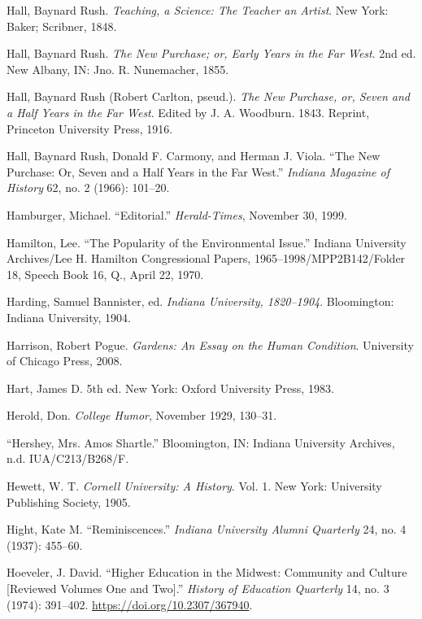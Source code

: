 \documentclass[
  american,
  letterpaper,
]{scrreprt}
\newlength{\cslhangindent}
\newenvironment{CSLReferences}[2] %
 {\begin{list}{}{%
  \setlength{\itemindent}{0pt}
  \setlength{\leftmargin}{0pt}
  \setlength{\parsep}{0pt}
  \ifodd #1
   \setlength{\leftmargin}{\cslhangindent}
   \setlength{\itemindent}{-1\cslhangindent}
  \fi
  \setlength{\itemsep}{#2\baselineskip}}}
 {\end{list}}
\begin{document}
\begin{CSLReferences}{1}{0}
Hall, Baynard Rush. \emph{Teaching, a Science: The Teacher an Artist}.
New York: Baker; Scribner, 1848.

Hall, Baynard Rush. \emph{The New Purchase; or, Early Years in the Far
West}. 2nd ed. New Albany, IN: Jno. R. Nunemacher, 1855.

Hall, Baynard Rush (Robert Carlton, pseud.). \emph{The New Purchase, or,
Seven and a Half Years in the Far West}. Edited by J. A. Woodburn. 1843.
Reprint, Princeton University Press, 1916.

Hall, Baynard Rush, Donald F. Carmony, and Herman J. Viola. {``The New
Purchase: Or, Seven and a Half Years in the Far West.''} \emph{Indiana
Magazine of History} 62, no. 2 (1966): 101--20.

Hamburger, Michael. {``Editorial.''} \emph{Herald-Times}, November 30,
1999.

Hamilton, Lee. {``The Popularity of the Environmental Issue.''} Indiana
University Archives/Lee H. Hamilton Congressional Papers,
1965--1998/MPP2B142/Folder 18, Speech Book 16, Q., April 22, 1970.

Harding, Samuel Bannister, ed. \emph{Indiana University, 1820--1904}.
Bloomington: Indiana University, 1904.

Harrison, Robert Pogue. \emph{Gardens: An Essay on the Human Condition}.
University of Chicago Press, 2008.

Hart, James D. 5th ed. New York: Oxford University Press, 1983.

Herold, Don. \emph{College Humor}, November 1929, 130--31.

{``Hershey, Mrs. Amos Shartle.''} Bloomington, IN: Indiana University
Archives, n.d. IUA/C213/B268/F.

Hewett, W. T. \emph{Cornell University: A History}. Vol. 1. New York:
University Publishing Society, 1905.

Hight, Kate M. {``Reminiscences.''} \emph{Indiana University Alumni
Quarterly} 24, no. 4 (1937): 455--60.

Hoeveler, J. David. {``Higher Education in the Midwest: Community and
Culture {[}Reviewed Volumes One and Two{]}.''} \emph{History of
Education Quarterly} 14, no. 3 (1974): 391--402.
\url{https://doi.org/10.2307/367940}.


\end{CSLReferences}
\end{document}
